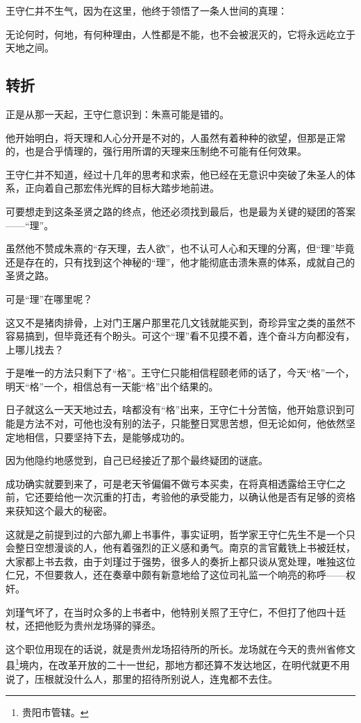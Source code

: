 \begin{multicols}{\theparacolNo}
		王守仁并不生气，因为在这里，他终于领悟了一条人世间的真理：

		无论何时，何地，有何种理由，人性都是不能，也不会被泯灭的，它将永远屹立于天地之间。

		\subsection{转折}
		正是从那一天起，王守仁意识到：朱熹可能是错的。

		他开始明白，将天理和人心分开是不对的，人虽然有着种种的欲望，但那是正常的，也是合乎情理的，强行用所谓的天理来压制绝不可能有任何效果。

		王守仁并不知道，经过十几年的思考和求索，他已经在无意识中突破了朱圣人的体系，正向着自己那宏伟光辉的目标大踏步地前进。

		可要想走到这条圣贤之路的终点，他还必须找到最后，也是最为关键的疑团的答案——“理”。

		虽然他不赞成朱熹的“存天理，去人欲”，也不认可人心和天理的分离，但“理”毕竟还是存在的，只有找到这个神秘的“理”，他才能彻底击溃朱熹的体系，成就自己的圣贤之路。

		可是“理”在哪里呢？

		这又不是猪肉排骨，上对门王屠户那里花几文钱就能买到，奇珍异宝之类的虽然不容易搞到，但毕竟还有个盼头。可这个“理”看不见摸不着，连个奋斗方向都没有，上哪儿找去？

		于是唯一的方法只剩下了“格”。王守仁只能相信程颐老师的话了，今天“格”一个，明天“格”一个，相信总有一天能“格”出个结果的。

		日子就这么一天天地过去，啥都没有“格”出来，王守仁十分苦恼，他开始意识到可能是方法不对，可他也没有别的法子，只能整日冥思苦想，但无论如何，他依然坚定地相信，只要坚持下去，是能够成功的。

		因为他隐约地感觉到，自己已经接近了那个最终疑团的谜底。

		成功确实就要到来了，可是老天爷偏偏不做亏本买卖，在将真相透露给王守仁之前，它还要给他一次沉重的打击，考验他的承受能力，以确认他是否有足够的资格来获知这个最大的秘密。

		这就是之前提到过的六部九卿上书事件，事实证明，哲学家王守仁先生不是一个只会整日空想漫谈的人，他有着强烈的正义感和勇气。南京的言官戴铣上书被廷杖，大家都上书去救，由于刘瑾过于强势，很多人的奏折上都只谈从宽处理，唯独这位仁兄，不但要救人，还在奏章中颇有新意地给了这位司礼监一个响亮的称呼——权奸。

		刘瑾气坏了，在当时众多的上书者中，他特别关照了王守仁，不但打了他四十廷杖，还把他贬为贵州龙场驿的驿丞。

		这个职位用现在的话说，就是贵州龙场招待所的所长。龙场就在今天的贵州省修文县\footnote{贵阳市管辖。}境内，在改革开放的二十一世纪，那地方都还算不发达地区，在明代就更不用说了，压根就没什么人，那里的招待所别说人，连鬼都不去住。


\end{multicols}
